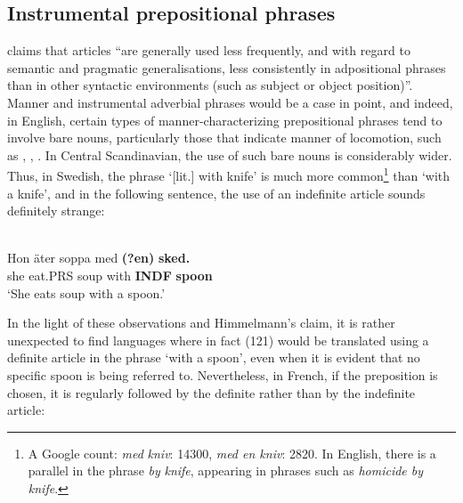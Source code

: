 
\subsection{ Instrumental prepositional phrases }

\citet{Himmelmann1998} claims that articles “are generally used less frequently, and with regard to semantic and pragmatic generalisations, less consistently in adpositional phrases than in other syntactic environments (such as subject or object position)”. Manner and instrumental adverbial phrases would be a case in point, and indeed, in English, certain types of manner-characterizing prepositional phrases tend to involve bare nouns, particularly those that indicate manner of locomotion, such as , , . In Central Scandinavian, the use of such bare nouns is considerably wider. Thus, in Swedish, the phrase  ‘[lit.] with knife’ is much more common\footnote{ A Google count: \textit{med}\textit{ }\textit{kniv}: 14300, \textit{med en kniv}: 2820. In English, there is a parallel in the phrase \textit{by} \textit{knife}, appearing in phrases such as \textit{homicide by knife}.} than ‘with a knife’, and in the following sentence, the use of an indefinite article sounds definitely strange:


\ea \label{} 
\\
\gll Hon  äter  soppa  med  \textbf{(?en)} \textbf{  sked.}\\
she  eat.PRS  soup  with  \textbf{INDF} \textbf{spoon}\\
\glt ‘She eats soup with a spoon.’

\z

In the light of these observations and Himmelmann’s claim, it is rather unexpected to find languages where in fact (121) would be translated using a definite article in the phrase ‘with a spoon’, even when it is evident that no specific spoon is being referred to. Nevertheless, in French, if the preposition  is chosen, it is regularly followed by the definite rather than by the indefinite article:

